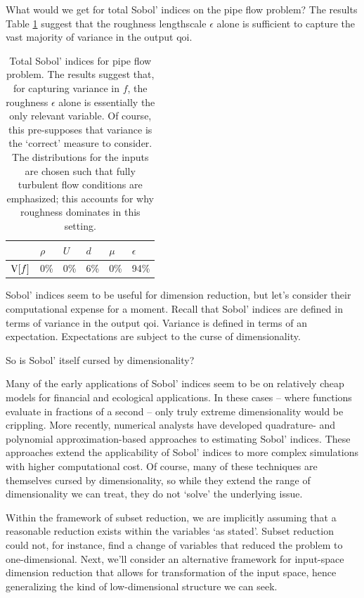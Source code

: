 \documentclass{article}
\begin{document}
What would we get for total Sobol' indices on the pipe flow problem? The results
Table \ref{tab:pipe-sobol} suggest that the roughness lengthscale $\epsilon$
alone is sufficient to capture the vast majority of variance in the output qoi.

\begin{table}[!ht]
  \centering
  \begin{tabular}{@{}llllll@{}}
   & $\rho$ & $U$ & $d$ & $\mu$ & $\epsilon$\\
  \hline
  $\mathrm{V}[f]$ & 0\% & 0\% & 6\% & 0\% & 94\% \\
  \end{tabular}
  \caption{Total Sobol' indices for pipe flow problem. The results suggest that,
    for capturing variance in $f$, the roughness $\epsilon$ alone is essentially
    the only relevant variable. Of course, this pre-supposes that variance is
    the `correct' measure to consider. The distributions for the inputs are
    chosen such that fully turbulent flow conditions are emphasized; this
    accounts for why roughness dominates in this setting.}
  \label{tab:pipe-sobol}
\end{table}

Sobol' indices seem to be useful for dimension reduction, but let's consider
their computational expense for a moment. Recall that Sobol' indices are defined
in terms of variance in the output qoi. Variance is defined in terms of an
expectation. Expectations are subject to the curse of dimensionality.

So is Sobol' itself cursed by dimensionality?

Many of the early applications of Sobol' indices seem to be on relatively cheap
models for financial and ecological applications.\cite{saltelli2004sensitivity}
In these cases -- where functions evaluate in fractions of a second -- only
truly extreme dimensionality would be crippling. More recently, numerical
analysts have developed quadrature- and polynomial approximation-based
approaches to estimating Sobol' indices.\cite{sudret2008global} These approaches
extend the applicability of Sobol' indices to more complex simulations with
higher computational cost. Of course, many of these techniques are themselves
cursed by dimensionality, so while they extend the range of dimensionality we
can treat, they do not `solve' the underlying issue.

Within the framework of subset reduction, we are implicitly assuming that a
reasonable reduction exists within the variables `as stated'. Subset reduction
could not, for instance, find a change of variables that reduced the problem to
one-dimensional. Next, we'll consider an alternative framework for input-space
dimension reduction that allows for transformation of the input space, hence
generalizing the kind of low-dimensional structure we can seek.
\end{document}
